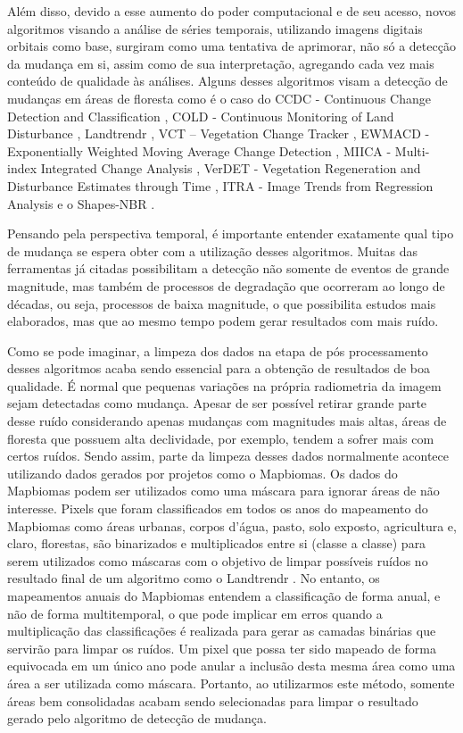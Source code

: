 \documentclass[12pt,a4paper]{article}
\begin{document}
Além disso, devido a esse aumento do poder computacional e de seu acesso, novos algoritmos visando a análise de séries temporais, utilizando imagens digitais orbitais como base, surgiram como uma tentativa de aprimorar, não só a detecção da mudança em si, assim como de sua interpretação, agregando cada vez mais conteúdo de qualidade às análises. Alguns desses algoritmos visam a detecção de mudanças em áreas de floresta como é o caso do CCDC - Continuous Change Detection and Classification \citep{ZHU2014152}, COLD - Continuous Monitoring of Land Disturbance \citep{Cohen2020}, Landtrendr \citep{KENNEDY20102897, KENNEDY2012117}, VCT – Vegetation Change Tracker \citep{Huang2010, THOMAS201119}, EWMACD - Exponentially Weighted Moving Average Change Detection \citep{Brooks2014}, MIICA - Multi-index Integrated Change Analysis \citep{JIN2013159}, VerDET - Vegetation Regeneration and Disturbance Estimates through Time \citep{Hughes2017}, ITRA - Image Trends from Regression Analysis \citep{VOGELMANN201292} e o Shapes-NBR \citep{Meyer2013, Moisen2016}.

Pensando pela perspectiva temporal, é importante entender exatamente qual tipo de mudança se espera obter com a utilização desses algoritmos. Muitas das ferramentas já citadas possibilitam a detecção não somente de eventos de grande magnitude, mas também de processos de degradação que ocorreram ao longo de décadas, ou seja, processos de baixa magnitude, o que possibilita estudos mais elaborados, mas que ao mesmo tempo podem gerar resultados com mais ruído.

Como se pode imaginar, a limpeza dos dados na etapa de pós processamento desses algoritmos acaba sendo essencial para a obtenção de resultados de boa qualidade. É normal que pequenas variações na própria radiometria da imagem sejam detectadas como mudança. Apesar de ser possível retirar grande parte desse ruído considerando apenas mudanças com magnitudes mais altas, áreas de floresta que possuem alta declividade, por exemplo, tendem a sofrer mais com certos ruídos. Sendo assim, parte da limpeza desses dados normalmente acontece utilizando dados gerados por projetos como o Mapbiomas. Os dados do Mapbiomas podem ser utilizados como uma máscara para ignorar áreas de não interesse. Pixels que foram classificados em todos os anos do mapeamento do Mapbiomas como áreas urbanas, corpos d’água, pasto, solo exposto, agricultura e, claro, florestas, são binarizados e multiplicados entre si (classe a classe) para serem utilizados como máscaras com o objetivo de limpar possíveis ruídos no resultado final de um algoritmo como o Landtrendr \cite{KENNEDY2007370, KENNEDY20102897, Kennedy2018}. No entanto, os mapeamentos anuais do Mapbiomas entendem a classificação de forma anual, e não de forma multitemporal, o que pode implicar em erros quando a multiplicação das classificações é realizada para gerar as camadas binárias que servirão para limpar os ruídos. Um pixel que possa ter sido mapeado de forma equivocada em um único ano pode anular a inclusão desta mesma área como uma área a ser utilizada como máscara. Portanto, ao utilizarmos este método, somente áreas bem consolidadas acabam sendo selecionadas para limpar o resultado gerado pelo algoritmo de detecção de mudança.
\end{document}
